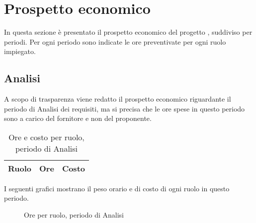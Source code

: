 


\section{Prospetto economico}

In questa sezione è presentato il prospetto economico del progetto \ProjectName{}, suddiviso per periodi. Per ogni periodo sono indicate le ore preventivate per ogni ruolo impiegato.

\subsection{Analisi}

A scopo di trasparenza viene redatto il prospetto economico riguardante il periodo di Analisi dei requisiti, ma si precisa che le ore spese in questo periodo sono a carico del fornitore e non del proponente.

\begin{table}[H]
	\centering
	\begin{tabular}{ l c c }
	\textbf{Ruolo} & \textbf{Ore} & \textbf{Costo} \\
	\hline
	
	\end{tabular}
	\caption{Ore e costo per ruolo, periodo di Analisi}
	\end{table}

I seguenti grafici mostrano il peso orario e di costo di ogni ruolo in questo periodo.

\begin{figure}[H]
\begin{tikzpicture}

	

\end{tikzpicture}
\caption{Ore per ruolo, periodo di Analisi}
\end{figure}

